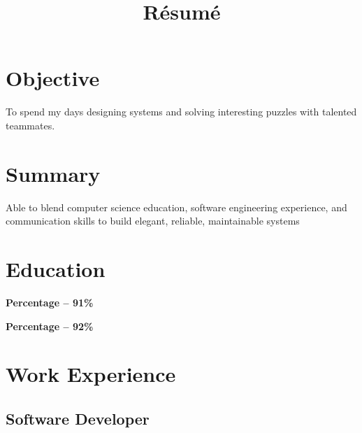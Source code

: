 \documentclass[11pt,a4paper,roman]{moderncv} %
\title{R\'esum\'e}
\begin{document}
\makecvtitle %


\vspace{-12mm} %
\section{Objective}
To spend my days designing systems and solving interesting puzzles with talented teammates.


\section{Summary}
Able to blend computer science education, software engineering experience, and communication skills to build elegant, reliable, maintainable systems


\section{Education}


  {} { {\bfseries Percentage -- 91\%}}

  {} { {\bfseries Percentage -- 92\%}}


\section{Work Experience}

\subsection{\bfseries{Software Developer}}
\end{document}
